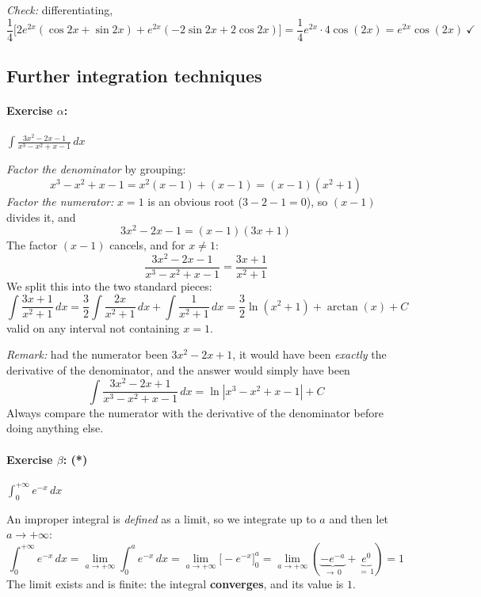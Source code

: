 \documentclass[]{article}
\begin{document}
	\textit{Check:} differentiating,
	$$
	\frac{1}{4}\Big[ 2e^{2x}\left(\cos 2x + \sin 2x\right) + e^{2x}\left(-2\sin 2x + 2\cos 2x\right) \Big]
	= \frac{1}{4}e^{2x} \cdot 4\cos(2x) = e^{2x}\cos(2x) \ \checkmark
	$$

	\subsection*{Further integration techniques}

	\paragraph{Exercise $\alpha$:} $\displaystyle \int \frac{3x^2-2x-1}{x^3-x^2+x-1}\,dx$

	\textit{Factor the denominator} by grouping:
	$$
	x^3 - x^2 + x - 1 = x^2(x-1) + (x-1) = (x-1)\left(x^2+1\right)
	$$
	\textit{Factor the numerator:} $x = 1$ is an obvious root ($3 - 2 - 1 = 0$), so $(x-1)$ divides it, and
	$$
	3x^2 - 2x - 1 = (x-1)(3x+1)
	$$
	The factor $(x-1)$ cancels, and for $x \neq 1$:
	$$
	\frac{3x^2-2x-1}{x^3-x^2+x-1} = \frac{3x+1}{x^2+1}
	$$
	We split this into the two standard pieces:
	$$
	\int \frac{3x+1}{x^2+1}\,dx
	= \frac{3}{2}\int \frac{2x}{x^2+1}\,dx + \int \frac{1}{x^2+1}\,dx
	= \frac{3}{2}\ln\left(x^2+1\right) + \arctan(x) + C
	$$
	valid on any interval not containing $x = 1$.

	\textit{Remark:} had the numerator been $3x^2 - 2x + 1$, it would have been \textit{exactly} the derivative of the denominator, and the answer would simply have been
	$$
	\int \frac{3x^2-2x+1}{x^3-x^2+x-1}\,dx = \ln\left| x^3-x^2+x-1 \right| + C
	$$
	Always compare the numerator with the derivative of the denominator before doing anything else.

	\paragraph{Exercise $\beta$: (*)} $\displaystyle \int_0^{+\infty} e^{-x}\,dx$

	An improper integral is \textit{defined} as a limit, so we integrate up to $a$ and then let $a \to +\infty$:
	$$
	\int_0^{+\infty} e^{-x}\,dx
	= \lim_{a \to +\infty} \int_0^{a} e^{-x}\,dx
	= \lim_{a \to +\infty} \Big[ -e^{-x} \Big]_0^{a}
	= \lim_{a \to +\infty} \left( \underbrace{-e^{-a}}_{\longrightarrow \, 0} + \underbrace{e^{0}}_{=\,1} \right)
	= 1
	$$
	The limit exists and is finite: the integral \textbf{converges}, and its value is $1$.
\end{document}
